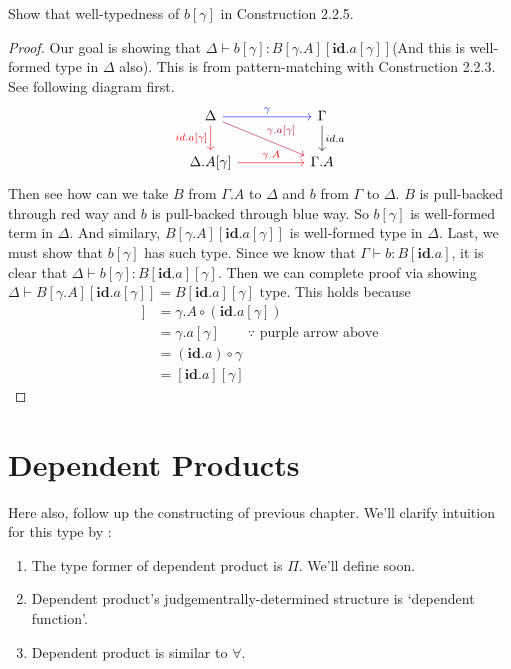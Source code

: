 \documentclass[12pt, a4paper, openany, twoside]{book}
\theoremstyle{definition}
\theoremstyle{remark}
\theoremstyle{plain}
\numberwithin{equation}{section}
\begin{document}
\begin{tcolorbox}[colback=yellow!10!white,colframe=brown!75!black,title=Exercise 2.17.]
Show that well-typedness of $b[\gamma]$ in Construction 2.2.5. 

\begin{proof}
    Our goal is showing that $\Delta \vdash b[\gamma] : B[\gamma.A][\textbf{id}.a[\gamma]]$(And this is well-formed type in $\Delta$ also). This is from 
    pattern-matching with Construction 2.2.3. 
    See following diagram first. 
    \[
    \begin{tikzcd}[column sep=huge]
        \Delta \arrow[r, "\gamma", blue] \arrow[d, "{id.a[\gamma]}"', red] \arrow[rd, "{\gamma.a[\gamma]}", purple] & \Gamma \arrow[d, "id.a"] \\
        \Delta.A[\gamma] \arrow[r, "\gamma.A", red] & \Gamma.A
    \end{tikzcd}
    \]
    Then see how can we take $B$ from $\Gamma.A$ to $\Delta$ and $b$ from $\Gamma$ to $\Delta$. 
    $B$ is pull-backed through red way and $b$ is pull-backed through blue way. So 
    $b[\gamma]$ is well-formed term in $\Delta$. And similary, $B[\gamma.A][\textbf{id}.a[\gamma]]$ is well-formed type in $\Delta$. 
    Last, we must show that $b[\gamma]$ has such type. Since we know that $\Gamma \vdash b : B[\textbf{id}.a]$, 
    it is clear that $\Delta \vdash b[\gamma] : B[\textbf{id}.a][\gamma]$. Then we can complete proof via showing 
    $\Delta \vdash B[\gamma.A][\textbf{id}.a[\gamma]] = B[\textbf{id}.a][\gamma] \text{ type}$. This holds because 
    \begin{align*}
        [\gamma.A][\textbf{id}.a[\gamma]] &= \gamma.A \circ (\textbf{id}.a[\gamma]) \\
        &= \gamma.a[\gamma] \qquad \text{$\because$ purple arrow above} \\
        &= (\textbf{id}.a) \circ \gamma \\
        &= [\textbf{id}.a][\gamma]
    \end{align*}
\end{proof}
\end{tcolorbox}

\newpage 

\section{Dependent Products}

Here also, follow up the constructing of previous chapter. We'll clarify intuition for this type by : 
\begin{enumerate}
    \item The type former of dependent product is $\Pi$. We'll define soon. 
    \item Dependent product's judgementrally-determined structure is \lq dependent function'. 
    \item Dependent product is similar to $\forall$. 
\end{enumerate}
\end{document}
